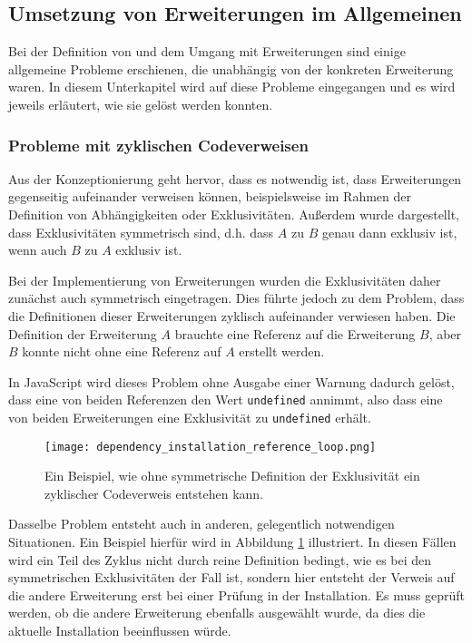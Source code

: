 \subsection{Umsetzung von Erweiterungen im Allgemeinen}
Bei der Definition von und dem Umgang mit Erweiterungen sind einige allgemeine Probleme erschienen, die unabhängig von der konkreten Erweiterung waren. In diesem Unterkapitel wird auf diese Probleme eingegangen und es wird jeweils erläutert, wie sie gelöst werden konnten.

\subsubsection{Probleme mit zyklischen Codeverweisen}
Aus der Konzeptionierung geht hervor, dass es notwendig ist, dass Erweiterungen gegenseitig aufeinander verweisen können, beispielsweise im Rahmen der Definition von Abhängigkeiten oder Exklusivitäten. Außerdem wurde dargestellt, dass Exklusivitäten symmetrisch sind, d.h. dass $A$ zu $B$ genau dann exklusiv ist, wenn auch $B$ zu $A$ exklusiv ist.

Bei der Implementierung von Erweiterungen wurden die Exklusivitäten daher zunächst auch symmetrisch eingetragen. Dies führte jedoch zu dem Problem, dass die Definitionen dieser Erweiterungen zyklisch aufeinander verwiesen haben. Die Definition der Erweiterung $A$ brauchte eine Referenz auf die Erweiterung $B$, aber $B$ konnte nicht ohne eine Referenz auf $A$ erstellt werden.

In JavaScript wird dieses Problem ohne Ausgabe einer Warnung dadurch gelöst, dass eine von beiden Referenzen den Wert \verb|undefined| annimmt, also dass eine von beiden Erweiterungen eine Exklusivität zu \verb|undefined| erhält.

  \begin{figure}
	\centering
		\texttt{[image: dependency\_installation\_reference\_loop.png]}
      	\caption{Ein Beispiel, wie ohne symmetrische Definition der Exklusivität ein zyklischer Codeverweis entstehen kann.}
		\label{fig:impl:dependency_installation_import_issue_example}
  \end{figure}

Dasselbe Problem entsteht auch in anderen, gelegentlich notwendigen Situationen. Ein Beispiel hierfür wird in Abbildung \ref{fig:impl:dependency_installation_import_issue_example} illustriert. In diesen Fällen wird ein Teil des Zyklus nicht durch reine Definition bedingt, wie es bei den symmetrischen Exklusivitäten der Fall ist, sondern hier entsteht der Verweis auf die andere Erweiterung erst bei einer Prüfung in der Installation. Es muss geprüft werden, ob die andere Erweiterung ebenfalls ausgewählt wurde, da dies die aktuelle Installation beeinflussen würde.

